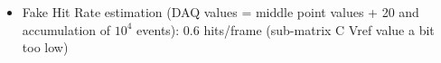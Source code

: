 \documentclass[a4papper, 10pt]{article}
\begin{document}
\begin{itemize}
        \item Fake Hit Rate estimation (DAQ values = middle point values + 20 and accumulation of $10^4$ events): 0.6 hits/frame (sub-matrix C Vref value a bit too low)
        
               
        \end{itemize}
 
\end{document}
